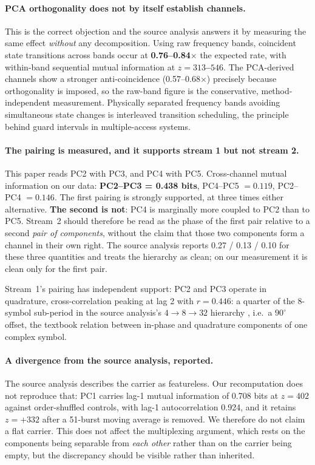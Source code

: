\documentclass[11pt,a4paper]{article}
\begin{document}
\paragraph{PCA orthogonality does not by itself establish channels.} This is the correct
objection and the source analysis answers it by measuring the same effect \emph{without}
any decomposition. Using raw frequency bands, coincident state transitions across bands
occur at \textbf{0.76--0.84$\times$} the expected rate, with within-band sequential
mutual information at \textbf{$z = 313$--$546$}. The PCA-derived channels show a stronger
anti-coincidence (0.57--0.68$\times$) precisely because orthogonality is imposed, so the
raw-band figure is the conservative, method-independent measurement. Physically separated
frequency bands avoiding simultaneous state changes is interleaved transition scheduling,
the principle behind guard intervals in multiple-access systems.

\paragraph{The pairing is measured, and it supports stream 1 but not stream 2.}
This paper reads PC2 with PC3, and PC4 with PC5. Cross-channel mutual information on our
data: \textbf{PC2--PC3 = 0.438 bits}, PC4--PC5 $= 0.119$, PC2--PC4 $= 0.146$. The first
pairing is strongly supported, at three times either alternative. \textbf{The second is
not}: PC4 is marginally more coupled to PC2 than to PC5. Stream~2 should therefore be
read as the phase of the first pair relative to a second \emph{pair of components},
without the claim that those two components form a channel in their own right. The
source analysis reports 0.27 / 0.13 / 0.10 for these three quantities and treats the
hierarchy as clean; on our measurement it is clean only for the first pair.

Stream~1's pairing has independent support: PC2 and PC3 operate in quadrature,
cross-correlation peaking at lag 2 with $r = 0.446$: a quarter of the 8-symbol
sub-period in the source analysis's $4 \rightarrow 8 \rightarrow 32$ hierarchy
\cite{meucci2026}, i.e.\ a $90^\circ$ offset, the textbook relation between in-phase
and quadrature components of one complex symbol.

\paragraph{A divergence from the source analysis, reported.} The source analysis
\cite{meucci2026} describes the carrier as featureless. Our recomputation does not
reproduce that: PC1 carries lag-1 mutual information of 0.708 bits at $z = 402$ against
order-shuffled controls, with lag-1 autocorrelation 0.924, and it retains $z = +332$
after a 51-burst moving average is removed. We therefore do not claim a flat
carrier. This does not affect the multiplexing argument, which rests on the components
being separable from \emph{each other} rather than on the carrier being empty, but the
discrepancy should be visible rather than inherited.
\end{document}
